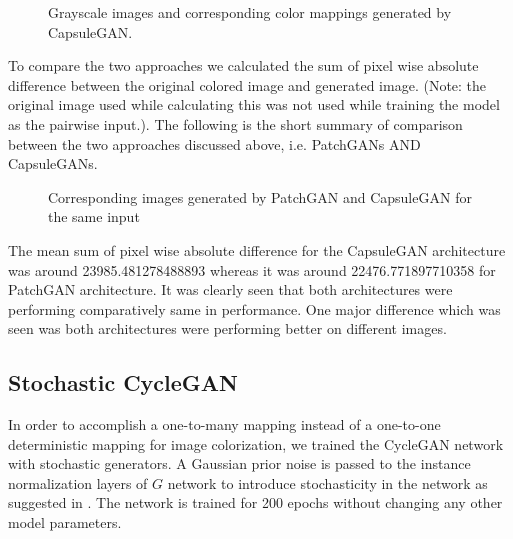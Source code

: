 \documentclass{article} %
\begin{document}
\begin{figure}[!htb]
	\begin{center}
	\end{center}
	\caption{Grayscale images and corresponding color mappings generated by CapsuleGAN.}
	\label{fig:capsulegan_results}
\end{figure}

To compare the two approaches we calculated the sum of pixel wise absolute difference between the original colored image and generated image. (Note: the original image used while calculating this was not used while training the model as the pairwise input.). The following is the short summary of comparison between the two approaches discussed above, i.e. PatchGANs AND CapsuleGANs. 

\begin{figure}[!htb]
	\begin{center}
	\end{center}
	\caption{Corresponding images generated by PatchGAN and CapsuleGAN for the same input}
	\label{fig:comparison}
\end{figure}

The mean sum of pixel wise absolute difference for the CapsuleGAN architecture was around 23985.481278488893 whereas it was around 22476.771897710358 for PatchGAN architecture. It was clearly seen that both architectures were performing comparatively same in performance. One major difference which was seen was both architectures were performing better on different images. 

\subsection{Stochastic CycleGAN}
In order to accomplish a one-to-many mapping instead of a one-to-one deterministic mapping for image colorization, we trained the CycleGAN network with stochastic generators. A Gaussian prior noise is passed to the instance normalization layers of $G$ network to introduce stochasticity in the network as suggested in \cite{cond_norm}. The network is trained for 200 epochs without changing any other model parameters.
\end{document}
